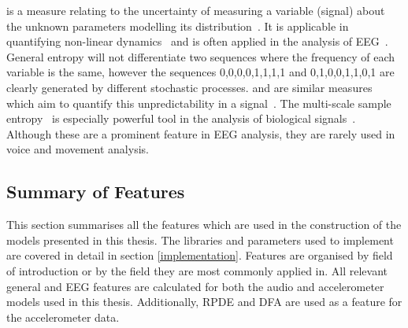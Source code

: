 \documentclass[12pt, twoside]{book}
\renewcommand\emph[1]{\textit{\color{USred}{#1}}}
\begin{document}
\emph{Fisher Information} is a measure relating to the uncertainty of measuring a variable (signal) about the unknown parameters modelling its distribution~\cite{fisherentropy}. It is applicable in quantifying non-linear dynamics~\cite{fisherinfo} and is often applied in the analysis of EEG~\cite{martin1999fisherinfoeeg}. General entropy will not differentiate two sequences where the frequency of each variable is the same, however the sequences 0,0,0,0,1,1,1,1 and 0,1,0,0,1,1,0,1 are clearly generated by different stochastic processes. \emph{Approximate} and \emph{sample entropy} are similar measures which aim to quantify this unpredictability in a signal~\cite{apsampentropy, apentropy}. The multi-scale sample entropy~\cite{multiscaleentropy} is especially powerful tool in the analysis of biological signals~\cite{samplegaitmulti, sampleheart}. Although these are a prominent feature in EEG analysis, they are rarely used in voice and movement analysis. 


\subsection{Summary of Features}
This section summarises all the features which are used in the construction of the models presented in this thesis. The libraries and parameters used to implement are covered in detail in section \ref{implementation}. Features are organised by field of introduction or by the field they are most commonly applied in. All relevant general and EEG features are calculated for both the audio and accelerometer models used in this thesis. Additionally, RPDE and DFA are used as a feature for the accelerometer data.
\end{document}
